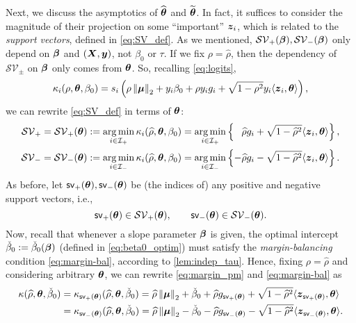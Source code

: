 Next, we discuss the asymptotics of $\widehat{{\boldsymbol{\theta}}}$ and $\widetilde{{\boldsymbol{\theta}}}$. In fact, it suffices to consider the magnitude of their projection on some ``important'' $\text{\boldmath $z$}_i$, which is related to the \emph{support vectors}, defined in \cref{eq:SV_def}. As we mentioned, $\mathcal{SV}_+({\boldsymbol{\beta}}), \mathcal{SV}_-({\boldsymbol{\beta}})$ only depend on ${\boldsymbol{\beta}}$ and $(\text{\boldmath $X$}, \text{\boldmath $y$})$, not $\beta_0$ or $\tau$. If we fix $\rho = \hat\rho$, then the dependency of $\mathcal{SV}_\pm$ on ${\boldsymbol{\beta}}$ only comes from ${\boldsymbol{\theta}}$. So, recalling \cref{eq:logits}, 
\[ \kappa_i(\rho, {\boldsymbol{\theta}}, \beta_0) = s_i \left( \rho \left\|{{\boldsymbol{\mu}}}\right\|_2 + y_i\beta_0 + \rho y_i g_i + \sqrt{1 - \rho^2} y_i \langle \text{\boldmath $z$}_i, {\boldsymbol{\theta}} \rangle \right), \]
we can rewrite \cref{eq:SV_def} in terms of ${\boldsymbol{\theta}}$:
\begin{equation}\label{eq:SV_def_theta}
	\begin{aligned}
		\mathcal{SV}_+ = \mathcal{SV}_+({\boldsymbol{\theta}}) & :=  \operatorname*{arg\,min}_{i \in \mathcal{I}_+} \kappa_i(\widehat\rho, {\boldsymbol{\theta}}, \beta_0)
	= \operatorname*{arg\,min}_{i \in \mathcal{I}_+} \left\{ \phantom{-} \widehat\rho g_i + \sqrt{1 - \widehat\rho^2} \langle \text{\boldmath $z$}_i, {\boldsymbol{\theta}} \rangle \right\} , \\
		\mathcal{SV}_- = \mathcal{SV}_-({\boldsymbol{\theta}}) & :=  \operatorname*{arg\,min}_{i \in \mathcal{I}_-} \kappa_i(\widehat\rho, {\boldsymbol{\theta}}, \beta_0)
	= \operatorname*{arg\,min}_{i \in \mathcal{I}_-} \left\{  - \widehat\rho g_i - \sqrt{1 - \widehat\rho^2} \langle \text{\boldmath $z$}_i, {\boldsymbol{\theta}} \rangle \right\} . \\
	\end{aligned}
\end{equation}
As before, let $\mathsf{sv}_+({\boldsymbol{\theta}}), \mathsf{sv}_-({\boldsymbol{\theta}})$ be (the indices of) any positive and negative support vectors, i.e.,
\begin{equation*}
	\mathsf{sv}_+({\boldsymbol{\theta}}) \in \mathcal{SV}_+({\boldsymbol{\theta}}),
	\qquad
	\mathsf{sv}_-({\boldsymbol{\theta}}) \in \mathcal{SV}_-({\boldsymbol{\theta}}).
\end{equation*} 
Now, recall that whenever a slope parameter ${\boldsymbol{\beta}}$ is given, the optimal intercept $\check\beta_0 := \check\beta_0({\boldsymbol{\beta}})$ (defined in \cref{eq:beta0_optim}) must satisfy the \emph{margin-balancing} condition \cref{eq:margin-bal}, according to \cref{lem:indep_tau}. Hence, fixing $\rho = \hat\rho$ and considering arbitrary ${\boldsymbol{\theta}}$, we can rewrite \cref{eq:margin_pm} and \eqref{eq:margin-bal} as
\begin{equation}\label{eq:svm_sv_bal}
    \begin{aligned}
       \kappa(\widehat\rho, {\boldsymbol{\theta}}, \check\beta_0) & = \kappa_{\mathsf{sv}_+({\boldsymbol{\theta}})}(\widehat\rho, {\boldsymbol{\theta}}, \check\beta_0) = 
       \widehat\rho \left\|{{\boldsymbol{\mu}}}\right\|_2 + \check\beta_0 + \widehat\rho g_{\mathsf{sv}_+({\boldsymbol{\theta}})} + \sqrt{1 - \widehat\rho^2} \langle \text{\boldmath $z$}_{\mathsf{sv}_+({\boldsymbol{\theta}})}, {\boldsymbol{\theta}} \rangle \\
       & = \kappa_{\mathsf{sv}_-({\boldsymbol{\theta}})}(\widehat\rho, {\boldsymbol{\theta}}, \check\beta_0) = 
       \widehat\rho \left\|{{\boldsymbol{\mu}}}\right\|_2 - \check\beta_0 - \widehat\rho g_{\mathsf{sv}_-({\boldsymbol{\theta}})} - \sqrt{1 - \widehat\rho^2} \langle \text{\boldmath $z$}_{\mathsf{sv}_-({\boldsymbol{\theta}})}, {\boldsymbol{\theta}} \rangle.
    \end{aligned}
\end{equation}
